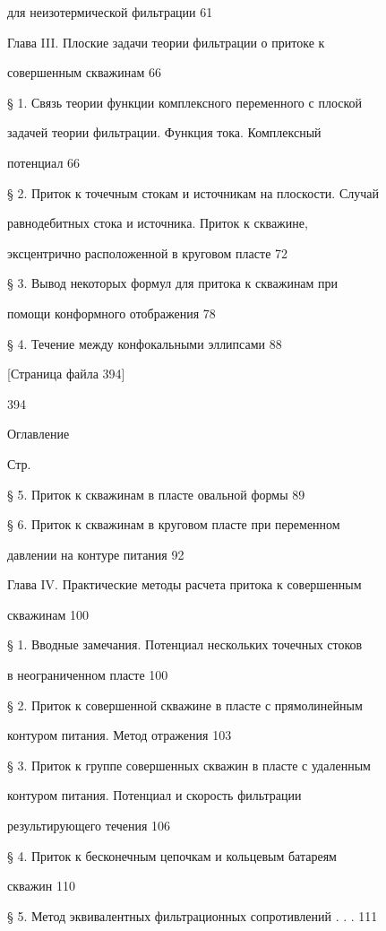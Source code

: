 \documentclass[
  11pt,
]{article}
\begin{document}
для неизотермической фильтрации 61 \par
Глава III. Плоские задачи теории фильтрации о притоке к  \par
совершенным скважинам 66 \par
§ 1. Связь теории функции комплексного переменного с плоской \par
задачей теории фильтрации. Функция тока. Комплексный \par
потенциал 66 \par
§ 2. Приток к точечным стокам и источникам на плоскости. Случай \par
равнодебитных стока и источника. Приток к скважине,  \par
эксцентрично расположенной в круговом пласте 72 \par
§ 3. Вывод некоторых формул для притока к скважинам при \par
помощи конформного отображения 78 \par
§ 4. Течение между конфокальными эллипсами 88 \par
\smallskip
\smallskip
\smallskip
{[}Страница файла 394{]}\par
394 \par
Оглавление \par
Стр. \par
§ 5. Приток к скважинам в пласте овальной формы 89 \par
§ 6. Приток к скважинам в круговом пласте при переменном  \par
давлении на контуре питания 92 \par
Глава IV. Практические методы расчета притока к совершенным  \par
скважинам 100 \par
§ 1. Вводные замечания. Потенциал нескольких точечных стоков \par
в неограниченном пласте 100 \par
§ 2. Приток к совершенной скважине в пласте с прямолинейным \par
контуром питания. Метод отражения 103 \par
§ 3. Приток к группе совершенных скважин в пласте с удаленным \par
контуром питания. Потенциал и скорость фильтрации  \par
результирующего течения 106 \par
§ 4. Приток к бесконечным цепочкам и кольцевым батареям  \par
скважин 110 \par
§ 5. Метод эквивалентных фильтрационных сопротивлений . . . 111 \par
\end{document}

